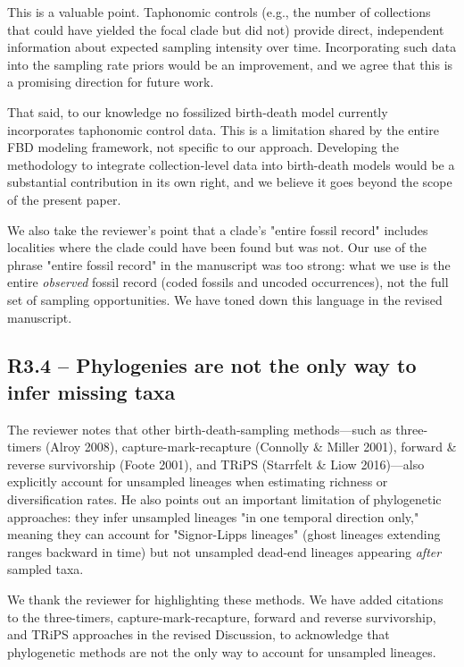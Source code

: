 \documentclass[11pt]{article}
\newcommand{\response}[1]{\noindent\textcolor{resp}{#1}\medskip}
\begin{document}
\response{This is a valuable point. Taphonomic controls (e.g., the number of collections that could have yielded the focal clade but did not) provide direct, independent information about expected sampling intensity over time. Incorporating such data into the sampling rate priors would be an improvement, and we agree that this is a promising direction for future work.}

\response{That said, to our knowledge no fossilized birth-death model currently incorporates taphonomic control data. This is a limitation shared by the entire FBD modeling framework, not specific to our approach. Developing the methodology to integrate collection-level data into birth-death models would be a substantial contribution in its own right, and we believe it goes beyond the scope of the present paper.}

\response{We also take the reviewer's point that a clade's "entire fossil record" includes localities where the clade could have been found but was not. Our use of the phrase "entire fossil record" in the manuscript was too strong: what we use is the entire \emph{observed} fossil record (coded fossils and uncoded occurrences), not the full set of sampling opportunities. We have toned down this language in the revised manuscript.}

\subsection*{R3.4 -- Phylogenies are not the only way to infer missing taxa}

The reviewer notes that other birth-death-sampling methods---such as three-timers (Alroy 2008), capture-mark-recapture (Connolly \& Miller 2001), forward \& reverse survivorship (Foote 2001), and TRiPS (Starrfelt \& Liow 2016)---also explicitly account for unsampled lineages when estimating richness or diversification rates. He also points out an important limitation of phylogenetic approaches: they infer unsampled lineages "in one temporal direction only," meaning they can account for "Signor-Lipps lineages" (ghost lineages extending ranges backward in time) but not unsampled dead-end lineages appearing \emph{after} sampled taxa.

\response{We thank the reviewer for highlighting these methods. We have added citations to the three-timers, capture-mark-recapture, forward and reverse survivorship, and TRiPS approaches in the revised Discussion, to acknowledge that phylogenetic methods are not the only way to account for unsampled lineages.}
\end{document}
